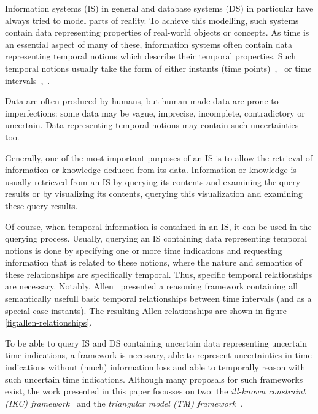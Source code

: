 Information systems (IS) in general and database systems (DS) in particular have always tried to model parts of reality. To achieve this modelling, such systems contain data representing properties of real-world objects or concepts. As time is an essential aspect of many of these, information systems often contain data representing temporal notions which describe their temporal properties. Such temporal notions usually take the form of either instants (time points)~\cite{Dyreson1994},~\cite{Jensen1998} or time intervals~\cite{Dyreson1994},~\cite{Jensen1998}.

Data are often produced by humans, but human-made data are prone to imperfections: some data may be vague, imprecise, incomplete, contradictory or uncertain. Data representing temporal notions may contain such uncertainties too. 

Generally, one of the most important purposes of an IS is to allow the retrieval of information or knowledge deduced from its data. Information or knowledge is usually retrieved from an IS by querying its contents and examining the query results or by visualizing its contents, querying this visualization and examining these query results.

Of course, when temporal information is contained in an IS, it can be used in the querying process. Usually, querying an IS containing data representing temporal notions is done by specifying one or more time indications and requesting information that is related to these notions, where the nature and semantics of these relationships are specifically temporal. Thus, specific temporal relationships are necessary. Notably, Allen~\cite{Allen1983} presented a reasoning framework containing all semantically usefull basic temporal relationships between time intervals (and as a special case instants). The resulting Allen relationships are shown in figure \ref{fig:allen-relationships}.

To be able to query IS and DS containing uncertain data representing uncertain time indications, a framework is necessary, able to represent uncertainties in time indications without (much) information loss and able to temporally reason with such uncertain time indications. Although many proposals for such frameworks exist, the work presented in this paper focusses on two: the \emph{ill-known constraint \emph{(IKC)} framework}~\cite{Pons2011} and the \emph{triangular model \emph{(TM)} framework}~\cite{DeTre2012}.

